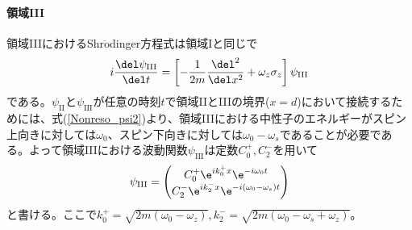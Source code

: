 \paragraph{領域III}
領域IIIにおけるShr$\ddot{\mathrm{o}}$dinger方程式は領域Iと同じで
\begin{equation}
i\frac{\del \psi_\mathrm{III}}{\del t}= \left[-\frac{1}{2m} \frac{\del^2}{\del x^2} +\omega_z \sigma_z\right] \psi_\mathrm{III}
\end{equation}
である。$\psi_\mathrm{II}$と$\psi_\mathrm{III}$が任意の時刻$t$で領域IIとIIIの境界($x=d$)において接続するためには、式(\ref{Nonreso_psi2})より、領域IIIにおける中性子のエネルギーがスピン上向きに対しては$\omega_0$、スピン下向きに対しては$\omega_0-\omega_s$であることが必要である。よって領域IIIにおける波動関数$\psi_\mathrm{III}$は定数$C_0^+,C_2^-$を用いて
\begin{equation}
\psi_\mathrm{III}=\begin{pmatrix} C_0^+ \e^{ik_0^+ x}\e^{-i\omega_0 t} \\ C_2^- \e^{ik_2^- x}\e^{-i(\omega_0-\omega_s) t} \end{pmatrix}
\end{equation}
と書ける。ここで$k_0^+=\sqrt{2m(\omega_0-\omega_z)},k_2^-=\sqrt{2m(\omega_0-\omega_s+\omega_z)}$。

